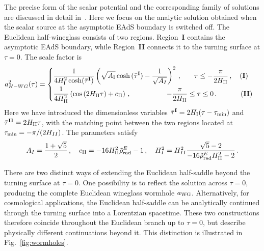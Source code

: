 \documentclass[a4paper,11pt]{article}
\begin{document}
The precise form of the scalar potential and the corresponding family of solutions are discussed in detail in~\cite{Betzios:2026rbv}. Here we focus on the analytic solution obtained when the scalar source at the asymptotic EAdS boundary is switched off. The Euclidean half-wineglass consists of two regions. Region~{\bf I} contains the asymptotic EAdS boundary, while Region~{\bf II} connects it to the turning surface at $\tau=0$. The scale factor is
\begin{equation}
 a_{H-WG}^2(\tau) = 
    \begin{cases}
   \displaystyle   \frac{1}{4 H_{\rm I}^2\cosh(\bar{\tau}^{\textbf{I}})}\left(\sqrt{A_{\rm I}}\cosh{(\bar{\tau}^{\textbf{I}})}-\frac{1}{\sqrt{A_{I}}}\right)^2\,, \quad\,\,\,\,\, \tau \leq -\frac{\pi}{2H_{\rm II}}\,, \quad (\textbf{I}) &  
\\[0.3cm]
   \displaystyle     \frac{1}{4 H_{\rm II}^2} \left(\cos{(2H_{\rm II}\tau)}+ c_{\rm II}\right)\,,  \hspace{1.8cm}  -\frac{\pi}{2H_{\rm II}} \leq \tau \leq 0\,.  \hspace{1.2cm} (\textbf{II}) &
\end{cases}
\label{eq:background_ans_simple}
\end{equation}
Here we have introduced the dimensionless variables $\bar{\tau}^{\textbf{I}}=2H_{\rm I}(\tau-\tau_{\rm min})$
and $\bar{\tau}^{\textbf{II}}=2H_{\rm II}\tau$, with the matching point between the two regions located at $\tau_{\rm min} = -\pi/(2H_{II})$. The parameters satisfy
\begin{equation}
    A_I = \frac{1+\sqrt{5}}{2}\,, \quad
    c_{\rm II} = -16H_{\rm II}^2\tilde{\rho}^E_{\rm rad}-1\,, \quad
    H_I^2 = H^2_{II}\frac{\sqrt{5}-2}{-16\tilde{\rho}^E_{\rm rad}H_{\rm II}^2-2}\,.
\end{equation}

There are two distinct ways of extending the Euclidean half-saddle beyond the turning surface at $\tau=0$. One possibility is to reflect the solution across $\tau=0$, producing the complete Euclidean wineglass wormhole $a_{\rm WG}$. Alternatively, for cosmological applications, the Euclidean half-saddle can be analytically continued through the turning surface into a Lorentzian spacetime. These two constructions therefore coincide throughout the Euclidean branch up to $\tau=0$, but describe physically different continuations beyond it. This distinction is illustrated in Fig.~\ref{fig:wormholes}.
\end{document}
